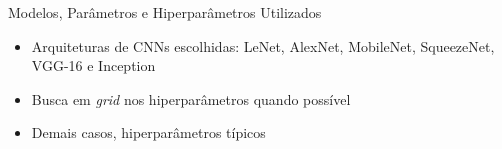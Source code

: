 \begin{frame}{\Large{Modelos, Parâmetros e Hiperparâmetros Utilizados}}
\begin{itemize}
  \item Arquiteturas de CNNs escolhidas: LeNet, AlexNet, MobileNet, SqueezeNet, VGG-16 e Inception
\end{itemize}

\begin{table}[h!]
	\centering
	\caption{Valores dos hiperparâmetros selecionados para a elaboração dos modelos.}
	\label{tab:parametros}
\end{table}

\begin{itemize}
  \item Busca em \emph{grid} nos hiperparâmetros quando possível
  \item Demais casos, hiperparâmetros típicos
\end{itemize}

\end{frame}
